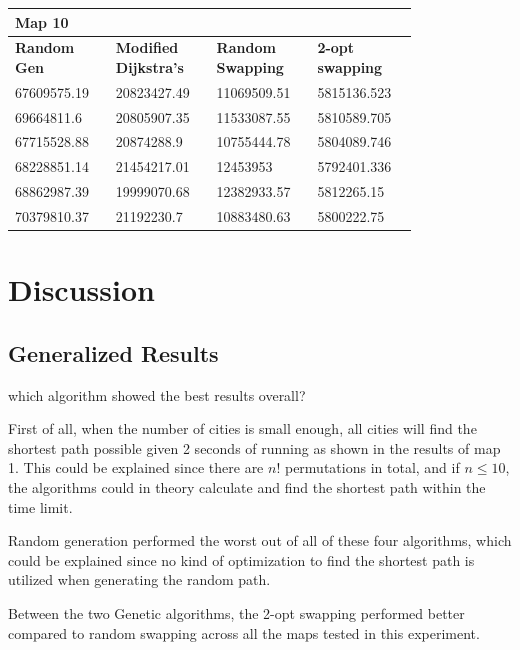\documentclass{article}
\begin{document}
\begin{table}[H]
    \centering
    \begin{tabular}{|p{0.2\linewidth}|p{0.2\linewidth}|p{0.2\linewidth}|p{0.2\linewidth}|}
    \hline
        \textbf{Map 10} & ~ & ~ & ~ \\ \hline
        \textbf{Random Gen} & \textbf{Modified Dijkstra's} & \textbf{Random Swapping} & \textbf{2-opt swapping} \\ \hline
        67609575.19 & 20823427.49 & 11069509.51 & 5815136.523 \\ \hline
        69664811.6 & 20805907.35 & 11533087.55 & 5810589.705 \\ \hline
        67715528.88 & 20874288.9 & 10755444.78 & 5804089.746 \\ \hline
        68228851.14 & 21454217.01 & 12453953 & 5792401.336 \\ \hline
        68862987.39 & 19999070.68 & 12382933.57 & 5812265.15 \\ \hline
        70379810.37 & 21192230.7 & 10883480.63 & 5800222.75 \\ \hline
    \end{tabular}
\end{table}



\newpage


\section{Discussion}\label{sec4}

\subsection{Generalized Results}\label{subsec1}
which algorithm showed the best results overall?

First of all, when the number of cities is small enough, all cities will find the shortest path possible given 2 seconds of running as shown in the results of map 1. This could be explained since there are $n!$ permutations in total, and if $n\leq 10$, the algorithms could in theory calculate and find the shortest path within the time limit.

Random generation performed the worst out of all of these four algorithms, which could be explained since no kind of optimization to find the shortest path is utilized when generating the random path. 

Between the two Genetic algorithms, the 2-opt swapping performed better compared to random swapping across all the maps tested in this experiment. 
\end{document}
